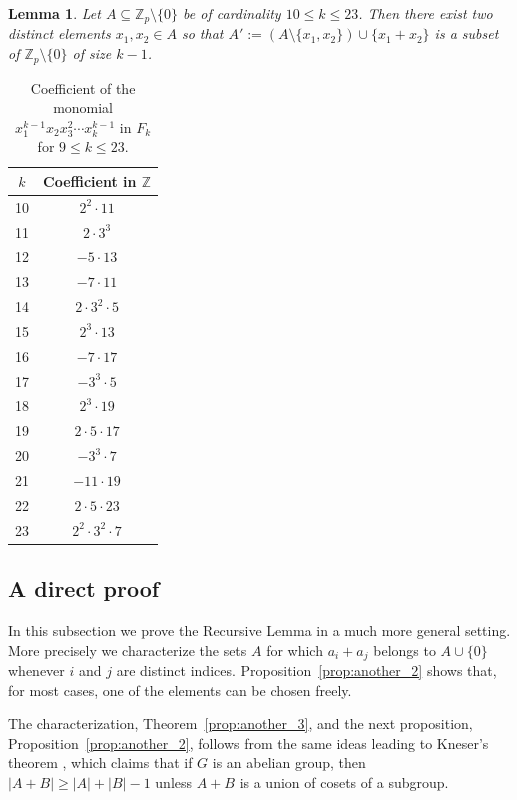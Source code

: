 \documentclass[11pt]{amsart}
\newtheorem{lemma}[theorem]{Lemma}
\theoremstyle{definition}
\begin{document}
\begin{lemma}
Let $A\subseteq \mathbb{Z}_p\setminus \{0\}$ be of cardinality $10\leq k\leq 23$. Then there exist two distinct elements $x_1,x_2\in A$ so that $A':=(A\setminus\{x_1,x_2\})\cup \{x_1+x_2\}$ is a subset of $\mathbb{Z}_p\setminus \{0\}$ of size $k-1$.
\end{lemma}

\begin{table}[h]
\centering
\small
\begin{tabular}{c c}
\hline
$k$ & Coefficient in $\mathbb{Z}$ \\
\hline
10  & $2^2 \cdot 11$ \\
11  & $2 \cdot 3^3$ \\
12  & $-5 \cdot 13$ \\
13  & $-7 \cdot 11$ \\
14  & $2 \cdot 3^2 \cdot 5$ \\
15  & $2^3 \cdot 13$ \\
16  & $-7 \cdot 17$ \\
17  & $-3^3 \cdot 5$ \\
18  & $2^3 \cdot 19$ \\
19  & $2 \cdot 5 \cdot 17$ \\
20  & $-3^3 \cdot 7$ \\
21  & $-11 \cdot 19$ \\
22  & $2 \cdot 5 \cdot 23$ \\
23  & $2^2 \cdot 3^2 \cdot 7$ \\
\hline
\end{tabular}
\caption{Coefficient of the monomial $x_1^{k-1} x_2 x_3^{2} \cdots x_k^{k-1}$ in $F_k$ for $9 \le k \le 23$.}
\label{tab:tab1}
\end{table}

\subsection{A direct proof}
In this subsection we %
prove the Recursive Lemma in a much more general setting. More precisely we %
characterize the sets $A$ for which $a_i+a_j$ belongs to $A\cup \{0\}$ whenever $i$ and $j$ are distinct indices. Proposition~\ref{prop:another_2} shows that, for most cases, one of the elements can be chosen freely.

The characterization, Theorem~\ref{prop:another_3}, and the next proposition, Proposition~\ref{prop:another_2}, follows from the same ideas leading to Kneser's theorem \cite{Kneser_1,Kneser_2,david}, which claims that if $G$ is an abelian group, then $|A+B|\geq |A|+|B|-1$ unless $A+B$ is a union of cosets of a subgroup.
\end{document}
